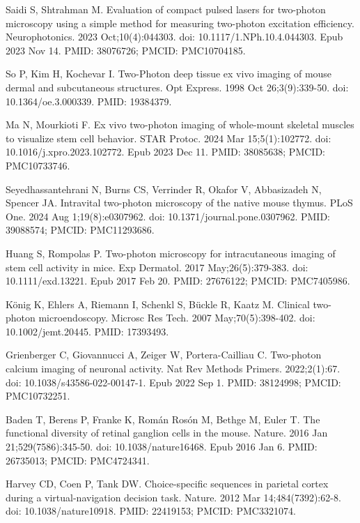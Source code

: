 \documentclass[10pt,letterpaper]{article}
\begin{document}
\begin{thebibliography}{10}
Saidi S, Shtrahman M. Evaluation of compact pulsed lasers for two-photon microscopy using a simple method for measuring two-photon excitation efficiency. Neurophotonics. 2023 Oct;10(4):044303. doi: 10.1117/1.NPh.10.4.044303. Epub 2023 Nov 14. PMID: 38076726; PMCID: PMC10704185.

So P, Kim H, Kochevar I. Two-Photon deep tissue ex vivo imaging of mouse dermal and subcutaneous structures. Opt Express. 1998 Oct 26;3(9):339-50. doi: 10.1364/oe.3.000339. PMID: 19384379.

Ma N, Mourkioti F. Ex vivo two-photon imaging of whole-mount skeletal muscles to visualize stem cell behavior. STAR Protoc. 2024 Mar 15;5(1):102772. doi: 10.1016/j.xpro.2023.102772. Epub 2023 Dec 11. PMID: 38085638; PMCID: PMC10733746.

Seyedhassantehrani N, Burns CS, Verrinder R, Okafor V, Abbasizadeh N, Spencer JA. Intravital two-photon microscopy of the native mouse thymus. PLoS One. 2024 Aug 1;19(8):e0307962. doi: 10.1371/journal.pone.0307962. PMID: 39088574; PMCID: PMC11293686.

Huang S, Rompolas P. Two-photon microscopy for intracutaneous imaging of stem cell activity in mice. Exp Dermatol. 2017 May;26(5):379-383. doi: 10.1111/exd.13221. Epub 2017 Feb 20. PMID: 27676122; PMCID: PMC7405986.

K\"onig K, Ehlers A, Riemann I, Schenkl S, Bückle R, Kaatz M. Clinical two-photon microendoscopy. Microsc Res Tech. 2007 May;70(5):398-402. doi: 10.1002/jemt.20445. PMID: 17393493.

Grienberger C, Giovannucci A, Zeiger W, Portera-Cailliau C. Two-photon calcium imaging of neuronal activity. Nat Rev Methods Primers. 2022;2(1):67. doi: 10.1038/s43586-022-00147-1. Epub 2022 Sep 1. PMID: 38124998; PMCID: PMC10732251.

Baden T, Berens P, Franke K, Román Rosón M, Bethge M, Euler T. The functional diversity of retinal ganglion cells in the mouse. Nature. 2016 Jan 21;529(7586):345-50. doi: 10.1038/nature16468. Epub 2016 Jan 6. PMID: 26735013; PMCID: PMC4724341.

Harvey CD, Coen P, Tank DW. Choice-specific sequences in parietal cortex during a virtual-navigation decision task. Nature. 2012 Mar 14;484(7392):62-8. doi: 10.1038/nature10918. PMID: 22419153; PMCID: PMC3321074.


\end{thebibliography}
\end{document}
